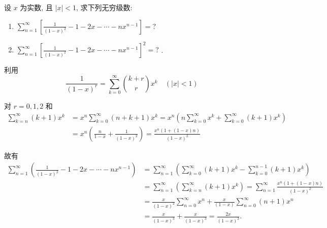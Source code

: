 \begin{solution}
    设 $x$ 为实数, 且 $|x|<1$, 求下列无穷级数:
    \begin{enumerate}
        \item $\sum_{n=1}^{\infty}\left[\frac{1}{(1-x)^2}-1-2 x-\cdots-n x^{n-1}\right]=?$
        \item $\sum_{n=1}^{\infty}\left[\frac{1}{(1-x)^2}-1-2 x-\cdots-n x^{n-1}\right]^2=?$ .
    \end{enumerate}

    利用
    $$
        \frac{1}{(1-x)^r}=\sum_{k=0}^{\infty}\binom{k+r}{r} x^k \quad(|x|<1)
    $$

    对 $r=0,1,2$ 和
    $$
        \begin{aligned}
            \sum_{k=n}^{\infty}(k+1) x^k & =x^n \sum_{k=0}^{\infty}(n+k+1) x^k=x^n\left(n \sum_{k=0}^{\infty} x^k+\sum_{k=0}^{\infty}(k+1) x^k\right) \\
                                         & =x^n\left(\frac{n}{1-x}+\frac{1}{(1-x)^2}\right)=\frac{x^n(1+(1-x) n)}{(1-x)^2}
        \end{aligned}
    $$

    故有
    $$
        \begin{aligned}
            \sum_{n=1}^{\infty}\left(\frac{1}{(1-x)^2}-1-2 x-\cdots-n x^{n-1}\right) & =\sum_{n=1}^{\infty}\left(\sum_{k=0}^{\infty}(k+1) x^k-\sum_{k=0}^{n-1}(k+1) x^k\right)                          \\
                                                                                     & =\sum_{n=1}^{\infty}\left(\sum_{k=n}^{\infty}(k+1) x^k\right)=\sum_{n=1}^{\infty} \frac{x^n(1+(1-x) n)}{(1-x)^2} \\
                                                                                     & =\frac{x}{(1-x)^2} \sum_{n=0}^{\infty} x^n+\frac{x}{(1-x)} \sum_{n=0}^{\infty}(n+1) x^n                          \\
                                                                                     & =\frac{x}{(1-x)^3}+\frac{x}{(1-x)^3}=\frac{2 x}{(1-x)^3} .
        \end{aligned}
    $$


\end{solution}
